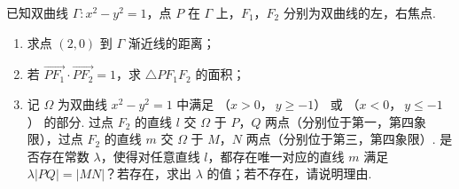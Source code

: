\begin{problem}
已知双曲线 \( \Gamma:x^2-y^2=1 \)，点 \(P\) 在 \( \Gamma \) 上，\(F_1\)，\(F_2\) 分别为双曲线的左，右焦点.

\begin{enumerate}
\item 求点 \( \left( 2,0 \right) \) 到 \( \Gamma \) 渐近线的距离；
\item 若 \( \overrightarrow{PF_1}\cdot \overrightarrow{PF_2}=1 \)，求 \( \triangle PF_1F_2 \) 的面积；
\item 记 \( \Omega \) 为双曲线 \( x^2-y^2=1 \) 中满足 （\(x>0\)，\(\ y\ge -1\)） 或 （\(x<0\)，\(\ y\le -1\)） 的部分. 过点 \(F_2\) 的直线 \( l \) 交 \( \Omega \) 于 \(P\)，\(Q\) 两点（分别位于第一，第四象限），过点 \(F_2\) 的直线 \( m \) 交 \( \Omega \) 于 \(M\)，\(N\) 两点（分别位于第三，第四象限）. 是否存在常数 \( \lambda \)，使得对任意直线 \( l \)，都存在唯一对应的直线 \( m \) 满足 \( \lambda \left| PQ \right|=\left| MN \right| \)？若存在，求出 \( \lambda \) 的值；若不存在，请说明理由.
\end{enumerate}
\end{problem}

